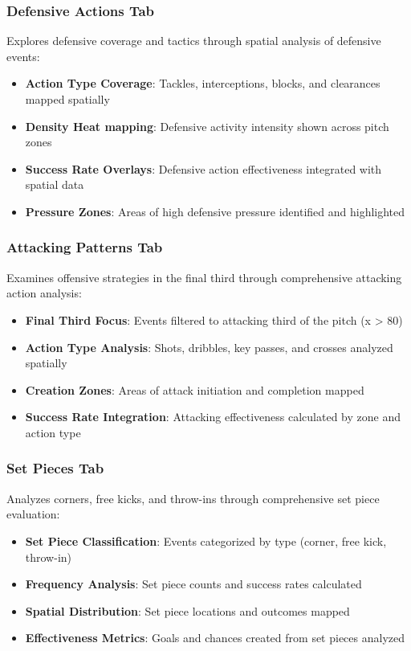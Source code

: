 \documentclass[12pt,a4paper]{article}
\begin{document}
\subsubsection{Defensive Actions Tab}
Explores defensive coverage and tactics through spatial analysis of defensive events:
\begin{itemize}
    \item \textbf{Action Type Coverage}: Tackles, interceptions, blocks, and clearances mapped spatially
    \item \textbf{Density Heat mapping}: Defensive activity intensity shown across pitch zones
    \item \textbf{Success Rate Overlays}: Defensive action effectiveness integrated with spatial data
    \item \textbf{Pressure Zones}: Areas of high defensive pressure identified and highlighted
\end{itemize}



\subsubsection{Attacking Patterns Tab}
Examines offensive strategies in the final third through comprehensive attacking action analysis:
\begin{itemize}
    \item \textbf{Final Third Focus}: Events filtered to attacking third of the pitch (x > 80)
    \item \textbf{Action Type Analysis}: Shots, dribbles, key passes, and crosses analyzed spatially
    \item \textbf{Creation Zones}: Areas of attack initiation and completion mapped
    \item \textbf{Success Rate Integration}: Attacking effectiveness calculated by zone and action type
\end{itemize}


\subsubsection{Set Pieces Tab}
Analyzes corners, free kicks, and throw-ins through comprehensive set piece evaluation:
\begin{itemize}
    \item \textbf{Set Piece Classification}: Events categorized by type (corner, free kick, throw-in)
    \item \textbf{Frequency Analysis}: Set piece counts and success rates calculated
    \item \textbf{Spatial Distribution}: Set piece locations and outcomes mapped
    \item \textbf{Effectiveness Metrics}: Goals and chances created from set pieces analyzed
\end{itemize}
\end{document}
